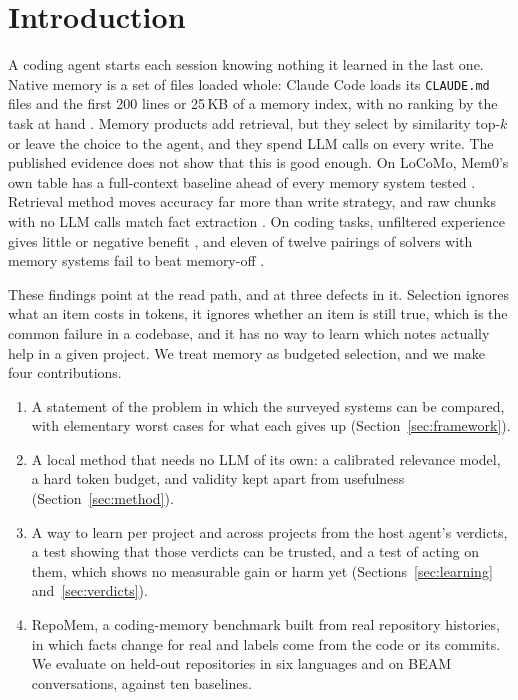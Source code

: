 \section{Introduction}

A coding agent starts each session knowing nothing it learned in the last one. Native memory is a set of files loaded whole: Claude Code loads its \texttt{CLAUDE.md} files and the first 200 lines or 25\,KB of a memory index, with no ranking by the task at hand \cite{claudecode_memory}. Memory products add retrieval, but they select by similarity top-$k$ or leave the choice to the agent, and they spend LLM calls on every write. The published evidence does not show that this is good enough. On LoCoMo, Mem0's own table has a full-context baseline ahead of every memory system tested \cite{chhikara2025mem0}. Retrieval method moves accuracy far more than write strategy, and raw chunks with no LLM calls match fact extraction \cite{yuan2026diagnosing}. On coding tasks, unfiltered experience gives little or negative benefit \cite{zhu2026swecontextbench}, and eleven of twelve pairings of solvers with memory systems fail to beat memory-off \cite{vibemembench2026}.

These findings point at the read path, and at three defects in it. Selection ignores what an item costs in tokens, it ignores whether an item is still true, which is the common failure in a codebase, and it has no way to learn which notes actually help in a given project. We treat memory as budgeted selection, and we make four contributions.
\begin{enumerate}
\item A statement of the problem in which the surveyed systems can be compared, with elementary worst cases for what each gives up (Section~\ref{sec:framework}).
\item A local method that needs no LLM of its own: a calibrated relevance model, a hard token budget, and validity kept apart from usefulness (Section~\ref{sec:method}).
\item A way to learn per project and across projects from the host agent's verdicts, a test showing that those verdicts can be trusted, and a test of acting on them, which shows no measurable gain or harm yet (Sections~\ref{sec:learning} and~\ref{sec:verdicts}).
\item RepoMem, a coding-memory benchmark built from real repository histories, in which facts change for real and labels come from the code or its commits. We evaluate on held-out repositories in six languages and on BEAM conversations, against ten baselines.
\end{enumerate}

